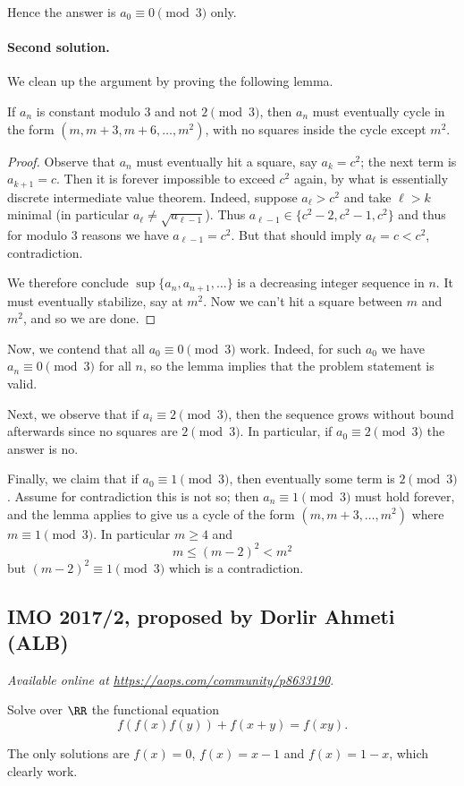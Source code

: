 \documentclass[11pt]{scrartcl}
\begin{document}
Hence the answer is $a_0 \equiv 0 \pmod 3$ only.

\paragraph{Second solution.}
We clean up the argument by proving the following lemma.
\begin{lemma*}
  If $a_n$ is constant modulo $3$ and not $2 \pmod 3$,
  then $a_n$ must eventually cycle in the form
  $(m, m+3, m+6, \dots, m^2)$,
  with no squares inside the cycle except $m^2$.
\end{lemma*}
\begin{proof}
  Observe that $a_n$ must eventually hit a square, say $a_k = c^2$;
  the next term is $a_{k+1} = c$.
  Then it is forever impossible to exceed $c^2$ again,
  by what is essentially discrete intermediate value theorem.
  Indeed, suppose $a_\ell > c^2$ and take $\ell > k$ minimal
  (in particular $a_{\ell} \neq \sqrt{a_{\ell-1}}$).
  Thus $a_{\ell-1} \in \{c^2-2, c^2-1, c^2\}$
  and thus for modulo $3$ reasons we have $a_{\ell-1} = c^2$.
  But that should imply $a_\ell = c < c^2$, contradiction.

  We therefore conclude $\sup \{a_n, a_{n+1}, \dots \}$ is a
  decreasing integer sequence in $n$.
  It must eventually stabilize, say at $m^2$.
  Now we can't hit a square between $m$ and $m^2$,
  and so we are done.
\end{proof}

Now, we contend that all $a_0 \equiv 0 \pmod 3$ work.
Indeed, for such $a_0$ we have $a_n \equiv 0 \pmod 3$ for all $n$,
so the lemma implies that the problem statement is valid.

Next, we observe that if $a_i \equiv 2 \pmod 3$,
then the sequence grows without bound afterwards
since no squares are $2 \pmod 3$.
In particular, if $a_0 \equiv 2 \pmod 3$ the answer is no.

Finally, we claim that if $a_0 \equiv 1 \pmod 3$,
then eventually some term is $2 \pmod 3$.
Assume for contradiction this is not so;
then $a_n \equiv 1 \pmod 3$ must hold forever,
and the lemma applies to give us a cycle of the form
$(m, m+3, \dots, m^2)$ where $m \equiv 1 \pmod 3$.
In particular $m \ge 4$ and
\[ m \le (m-2)^2 < m^2 \]
but $(m-2)^2 \equiv 1 \pmod 3$ which is a contradiction.
\pagebreak

\subsection{IMO 2017/2, proposed by Dorlir Ahmeti (ALB)}
\textsl{Available online at \url{https://aops.com/community/p8633190}.}
\begin{mdframed}[style=mdpurplebox,frametitle={Problem statement}]
Solve over $\RR$ the functional equation
\[ f\left( f(x)f(y) \right) + f(x+y) = f(xy). \]
\end{mdframed}
The only solutions are $f(x) = 0$, $f(x) = x-1$ and $f(x)=1-x$,
which clearly work.
\end{document}
